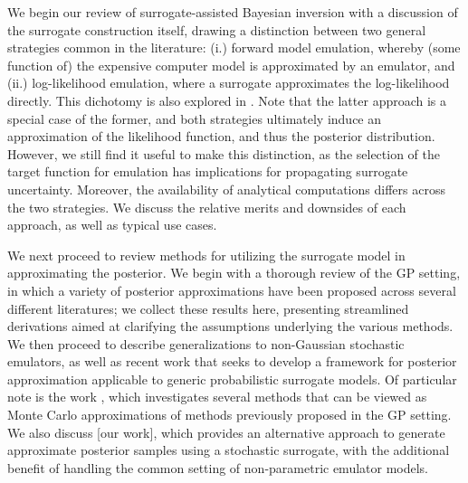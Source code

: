\documentclass[12pt]{article}
\begin{document}
We begin our review of surrogate-assisted Bayesian inversion with a discussion of the surrogate construction itself,
drawing a distinction between two general strategies common in the literature: (i.) forward model emulation, whereby
(some function of) the expensive computer model is approximated by an emulator, and (ii.) log-likelihood emulation, where
a surrogate approximates the log-likelihood directly. This dichotomy is also explored in
 \citet{StuartTeck1,Surer2023sequential,GP_PDE_priors,random_fwd_models}.
Note that the latter approach is a special case of the former, and both strategies ultimately induce an 
approximation of the likelihood function, and thus the posterior distribution. However, we still find it useful to make this distinction, 
as the selection of the target function for emulation has implications for propagating surrogate uncertainty. Moreover, the 
availability of analytical computations differs across the two strategies. We discuss the relative merits and downsides of each 
approach, as well as typical use cases.

We next proceed to review methods for utilizing the surrogate model in approximating the posterior. We begin with a thorough 
review of the GP setting, in which a variety of posterior approximations have been proposed across several different literatures; 
we collect these results here, presenting streamlined derivations aimed at clarifying the assumptions underlying the various 
methods. We then proceed to describe generalizations to non-Gaussian stochastic emulators, as well as recent work
that seeks to develop a framework for posterior approximation applicable to generic probabilistic surrogate models.
Of particular note is the work \citet{BurknerSurrogate}, which investigates several methods that can be viewed as 
Monte Carlo approximations of methods previously proposed in the GP setting.
We also discuss [our work], which provides an alternative approach to generate approximate posterior samples using a 
stochastic surrogate, with the additional benefit of handling the common setting of non-parametric emulator models.
\end{document}
